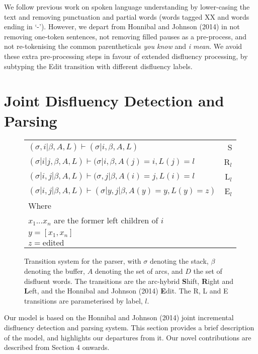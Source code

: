 \documentclass[11pt,letterpaper]{article}
\begin{document}
We follow previous work on spoken language understanding by lower-casing the text
and removing punctuation and partial words (words tagged XX and words ending in
`-').  However, we depart from Honnibal and Johnson (2014) in not removing one-token
sentences, not removing filled pauses as a pre-process, and not
re-tokenising the common parentheticals \emph{you know} and \emph{i mean}.
We avoid these extra pre-processing steps in favour of extended disfluency processing,
by subtyping the Edit transition with different disfluency labels.

\section{Joint Disfluency Detection and Parsing}

\begin{figure}
    \centering
    \small
    \begin{tabular}{lr}
        \hline
        $(\sigma, i | \beta, A, L) \vdash (\sigma | i, \beta, A, L)$ & S \\
        $(\sigma | i | j, \beta, A, L) \vdash (\sigma | i, \beta, A(j)=i, L(j)=l$ & R$_l$ \\ 
        $(\sigma | i, j | \beta, A, L) \vdash (\sigma, j | \beta, A(i)=j, L(i)=l$ & L$_l$ \\
        $(\sigma | i, j | \beta, A, L) \vdash (\sigma | y, j | \beta, A(y)=y, L(y)=z)$ & E$_l$ \\
        Where \\
        $x_1...x_n$ are the former left children of $i$ \\
        $y = [x_1, x_n]$ \\
        $z = \mathrm{edited}$ \\
        \hline
\end{tabular}
\caption{\small Transition system for the parser, with $\sigma$ denoting the
    stack, $\beta$ denoting the buffer, $A$ denoting the set of arcs, and $D$ the
    set of disfluent words.  The transitions are the arc-hybrid \textbf{S}hift,
    \textbf{R}ight and \textbf{L}eft, and the Honnibal and Johnson (2014) \textbf{E}dit.
    The R, L and E transitions are parameterised by label, $l$.
\label{fig:trans}}
\vspace*{-3em}
\end{figure}
Our model is based on the Honnibal and Johnson (2014) joint incremental disfluency
detection and parsing system.  This section provides a brief description of
the model, and highlights our departures from it.
Our novel contributions are described from Section 4 onwards.
%
\end{document}
